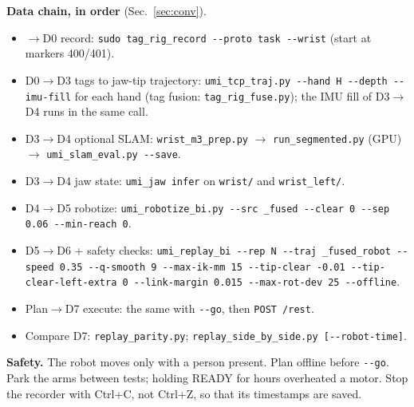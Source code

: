 \documentclass[conference,10pt]{IEEEtran}
\begin{document}
\noindent\textbf{Data chain, in order} (Sec.~\ref{sec:conv}).
\begin{itemize}
\item $\to$D0 record: \texttt{sudo tag\_rig\_record -{}-proto task -{}-wrist} (start at markers 400/401).
\item D0$\to$D3 tags to jaw-tip trajectory: \texttt{umi\_tcp\_traj.py -{}-hand H -{}-depth -{}-imu-fill} for each hand
  (tag fusion: \texttt{tag\_rig\_fuse.py}); the IMU fill of D3$\to$D4 runs in the same call.
\item D3$\to$D4 optional SLAM: \texttt{wrist\_m3\_prep.py} $\to$ \texttt{run\_segmented.py} (GPU) $\to$
  \texttt{umi\_slam\_eval.py -{}-save}.
\item D3$\to$D4 jaw state: \texttt{umi\_jaw infer} on \texttt{wrist/} and \texttt{wrist\_left/}.
\item D4$\to$D5 robotize: \texttt{umi\_robotize\_bi.py -{}-src \_fused -{}-clear 0 -{}-sep 0.06 -{}-min-reach 0}.
\item D5$\to$D6 + safety checks: \texttt{umi\_replay\_bi -{}-rep N -{}-traj \_fused\_robot -{}-speed 0.35 -{}-q-smooth 9
  -{}-max-ik-mm 15 -{}-tip-clear -0.01 -{}-tip-clear-left-extra 0 -{}-link-margin 0.015 -{}-max-rot-dev 25 -{}-offline}.
\item Plan$\to$D7 execute: the same with \texttt{-{}-go}, then \texttt{POST /rest}.
\item Compare D7: \texttt{replay\_parity.py}; \texttt{replay\_side\_by\_side.py [-{}-robot-time]}.
\end{itemize}

\noindent\textbf{Safety.} The robot moves only with a person present. Plan offline before \texttt{-{}-go}. Park the arms
between tests; holding READY for hours overheated a motor. Stop the recorder with Ctrl+C, not Ctrl+Z, so that its
timestamps are saved.
\end{document}
